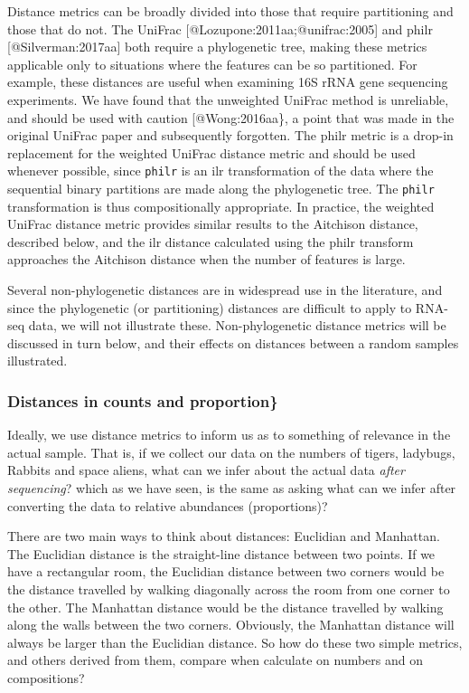 \documentclass[
  onecolumn]{article}
\begin{document}
Distance metrics can be broadly divided into those that require partitioning and those that do not. The UniFrac {[}@Lozupone:2011aa;@unifrac:2005{]} and philr {[}@Silverman:2017aa{]} both require a phylogenetic tree, making these metrics applicable only to situations where the features can be so partitioned. For example, these distances are useful when examining 16S rRNA gene sequencing experiments. We have found that the unweighted UniFrac method is unreliable, and should be used with caution {[}@Wong:2016aa\}, a point that was made in the original UniFrac paper and subsequently forgotten. The philr metric is a drop-in replacement for the weighted UniFrac distance metric and should be used whenever possible, since \texttt{philr} is an ilr transformation of the data where the sequential binary partitions are made along the phylogenetic tree. The \texttt{philr} transformation is thus compositionally appropriate. In practice, the weighted UniFrac distance metric provides similar results to the Aitchison distance, described below, and the ilr distance calculated using the philr transform approaches the Aitchison distance when the number of features is large.

Several non-phylogenetic distances are in widespread use in the literature, and since the phylogenetic (or partitioning) distances are difficult to apply to RNA-seq data, we will not illustrate these. Non-phylogenetic distance metrics will be discussed in turn below, and their effects on distances between a random samples illustrated.

\hypertarget{distances-in-counts-and-proportion}{%
\subsubsection{Distances in counts and proportion\}}\label{distances-in-counts-and-proportion}}

Ideally, we use distance metrics to inform us as to something of relevance in the actual sample. That is, if we collect our data on the numbers of tigers, ladybugs, Rabbits and space aliens, what can we infer about the actual data \emph{after  sequencing}? which as we have seen, is the same as asking what can we infer after converting the data to relative abundances (proportions)?

There are two main ways to think about distances: Euclidian and Manhattan. The Euclidian distance is the straight-line distance between two points. If we have a rectangular room, the Euclidian distance between two corners would be the distance travelled by walking diagonally across the room from one corner to the other. The Manhattan distance would be the distance travelled by walking along the walls between the two corners. Obviously, the Manhattan distance will always be larger than the Euclidian distance. So how do these two simple metrics, and others derived from them, compare when calculate on numbers and on compositions?
\end{document}
